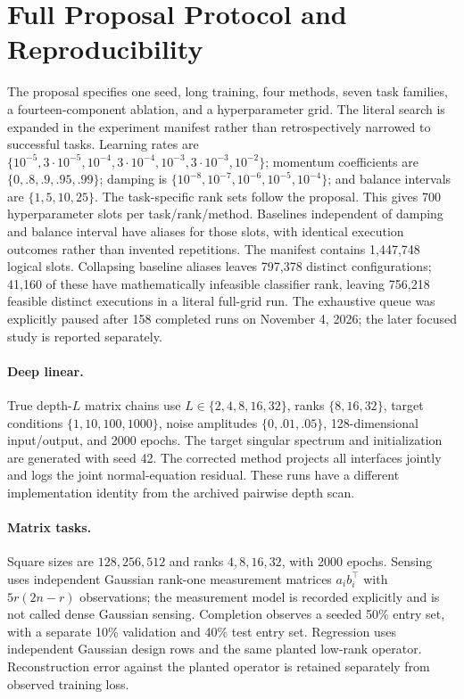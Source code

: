 \section{Full Proposal Protocol and Reproducibility}
\label{app:full-protocol}
The proposal specifies one seed, long training, four methods, seven task families, a fourteen-component ablation, and a hyperparameter grid. The literal search is expanded in the experiment manifest rather than retrospectively narrowed to successful tasks. Learning rates are $\{10^{-5},3\cdot10^{-5},10^{-4},3\cdot10^{-4},10^{-3},3\cdot10^{-3},10^{-2}\}$; momentum coefficients are $\{0,.8,.9,.95,.99\}$; damping is $\{10^{-8},10^{-7},10^{-6},10^{-5},10^{-4}\}$; and balance intervals are $\{1,5,10,25\}$. The task-specific rank sets follow the proposal. This gives 700 hyperparameter slots per task/rank/method. Baselines independent of damping and balance interval have aliases for those slots, with identical execution outcomes rather than invented repetitions.
The manifest contains 1,447,748 logical slots. Collapsing baseline
aliases leaves 797,378 distinct configurations; 41,160 of these have
mathematically infeasible classifier rank, leaving 756,218 feasible
distinct executions in a literal full-grid run. The exhaustive queue
was explicitly paused after 158 completed runs on November 4, 2026;
the later focused study is reported separately.

\paragraph{Deep linear.} True depth-$L$ matrix chains use $L\in\{2,4,8,16,32\}$, ranks $\{8,16,32\}$, target conditions $\{1,10,100,1000\}$, noise amplitudes $\{0,.01,.05\}$, 128-dimensional input/output, and 2000 epochs. The target singular spectrum and initialization are generated with seed 42. The corrected method projects all interfaces jointly and logs the joint normal-equation residual. These runs have a different implementation identity from the archived pairwise depth scan.

\paragraph{Matrix tasks.} Square sizes are $128,256,512$ and ranks $4,8,16,32$, with 2000 epochs. Sensing uses independent Gaussian rank-one measurement matrices $a_ib_i^\top$ with $5r(2n-r)$ observations; the measurement model is recorded explicitly and is not called dense Gaussian sensing. Completion observes a seeded 50\% entry set, with a separate 10\% validation and 40\% test entry set. Regression uses independent Gaussian design rows and the same planted low-rank operator. Reconstruction error against the planted operator is retained separately from observed training loss.


